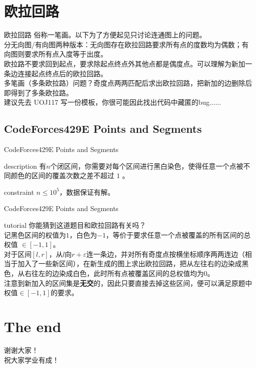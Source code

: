 \documentclass{beamer}
\begin{document}
\section{欧拉回路}
\begin{frame}{欧拉回路}
	俗称一笔画。以下为了方便起见只讨论连通图上的问题。\\
	
	分无向图/有向图两种版本：无向图存在欧拉回路要求所有点的度数均为偶数；有向图则要求所有点入度等于出度。\\
	
	欧拉路不要求回到起点，要求除起点终点外其他点都是偶度点。可以理解为新加一条边连接起点终点后的欧拉回路。\pause\\
	
	多笔画（多条欧拉路）问题？\pause 奇度点两两匹配后求出欧拉回路，把新加的边删除后即得到了多条欧拉路。\pause\\
	
	建议先去 UOJ117 写一份模板，你很可能因此找出代码中藏匿的bug......
	
\end{frame}

\subsection{CodeForces429E Points and Segments}
\begin{frame}{CodeForces429E Points and Segments}
	\begin{block}{description}
		有$n$个闭区间，你需要对每个区间进行黑白染色，使得任意一个点被不同颜色的区间的覆盖次数之差不超过 $1$ 。
	\end{block}
	\begin{block}{constraint}
		$n \le 10^5$，数据保证有解。
	\end{block}
\end{frame}

\begin{frame}{CodeForces429E Points and Segments}
	\begin{block}{tutorial}
		你能猜到这道题目和欧拉回路有关吗？\\
		
		记黑色区间的权值为$1$，白色为$-1$，等价于要求任意一个点被覆盖的所有区间的总权值 $\in [-1,1]$。\\
		
		对于区间$[l,r]$，从$l$向$r+\varepsilon$连一条边，并对所有奇度点按横坐标顺序两两连边（相当于加入了一些新区间），在新生成的图上求出欧拉回路，把从左往右的边染成黑色，从右往左的边染成白色，此时所有点被覆盖区间的总权值均为$0$。\\
		
		注意到新加入的区间集是\textbf{无交}的，因此只要直接去掉这些区间，便可以满足原题中权值$\in[-1,1]$的要求。
		
	\end{block}
\end{frame}

\section{The end}
\begin{frame}
	\begin{center}
		{\huge 谢谢大家！\\  \large 祝大家学业有成！}
	\end{center}
\end{frame}
\end{document}
